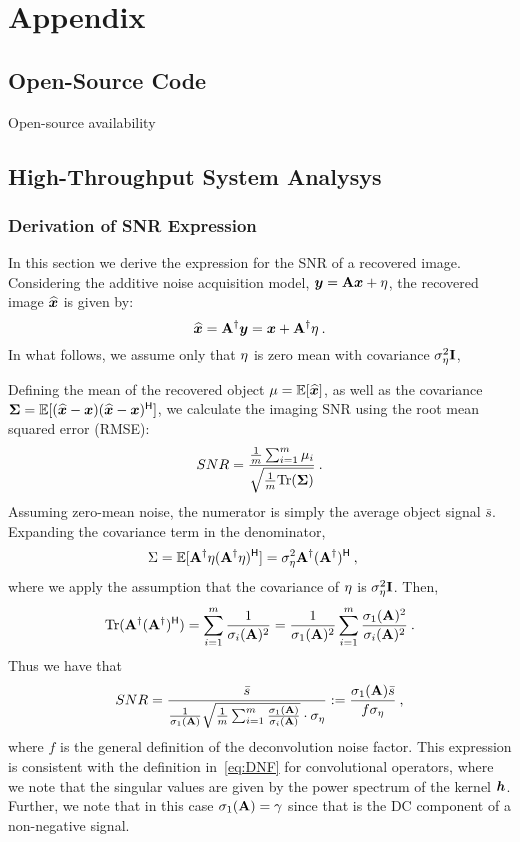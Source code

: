 \chapter{Appendix} \label{ch:appendix}

\section{Open-Source Code} \label{sec:appendix:opensource}
Open-source availability
\section{High-Throughput System Analysys}  \label{sec:appendix:highthroughput}
\subsection{Derivation of SNR Expression}
\label{sec:snr_derivation}

In this section we derive the expression for the SNR of a recovered image. Considering the additive noise acquisition model, $\bm{y} = \mathbf{A}\bm{x} + {\eta}$, 
the recovered image $\widehat {\bm{x}}$ is given by:
\[\widehat {\bm{x}} =  \mathbf{A}^\dagger  \bm{y} = \bm{x} +  \mathbf{A}^\dagger  {\eta}\:.\]
In what follows, we assume only that ${\eta}$ is zero mean with covariance $\sigma_{\eta}^2 \mathbf{I}$,

Defining the mean of the recovered object $\mu = \mathbb{E}[\widehat {\bm{x}}]$, as well as the covariance $\mathbf\Sigma = \mathbb{E}[(\widehat {\bm{x}}-\bm{x}) (\widehat {\bm{x}}-\bm{x})^{\mathsf{H}}]$, we calculate the imaging SNR using the root mean squared error (RMSE):
\[SNR = \frac{\frac{1}{m}\sum_{i=1}^m\mu_i}{\sqrt{\frac{1}{m}\mathrm{Tr}(\mathbf\Sigma)}}\:.\]
Assuming zero-mean noise, the numerator is simply the average object signal $\bar s$.
Expanding the covariance term in the denominator,
\begin{align*}
    \Sigma &= \mathbb{E}[ \mathbf{A}^\dagger  {\eta}( \mathbf{A}^\dagger  {\eta})^{\mathsf{H}}]
    = \sigma_{ {\eta}}^2  \mathbf{A}^\dagger ( \mathbf{A}^\dagger)^{\mathsf{H}}\:,
\end{align*}
where we apply the assumption that the covariance of ${\eta}$ is $\sigma_{\eta}^2 \mathbf{I}$. Then,
\[\mathrm{Tr}( \mathbf{A}^\dagger ( \mathbf{A}^\dagger)^{\mathsf{H}} ) = \sum_{i=1}^m \frac{1}{\sigma_i( \mathbf{A})^2} = \frac{1}{\sigma_1(\mathbf{A})^2} \sum_{i=1}^m \frac{\sigma_1(\mathbf{A})^2}{\sigma_i(\mathbf{A})^2} \:.\]
Thus we have that
\[SNR = \frac{\bar s}{\frac{1}{\sigma_1(\mathbf{A})} \sqrt{\frac{1}{m}\sum_{i=1}^m \frac{\sigma_1(\mathbf{A})}{\sigma_i(\mathbf{A})}} \cdot\sigma_\eta} := \frac{\sigma_1(\mathbf{A}) \bar s }{ f\sigma_\eta }\:,\]
where $f$ is the general definition of the deconvolution noise factor. This expression is consistent with the definition in~\eqref{eq:DNF} for convolutional operators, where we note that the singular values are given by the power spectrum of the kernel $\bm{h}$. Further, we note that in this case $\sigma_1(\mathbf{A})=\gamma$ since that is the DC component of a non-negative signal.

